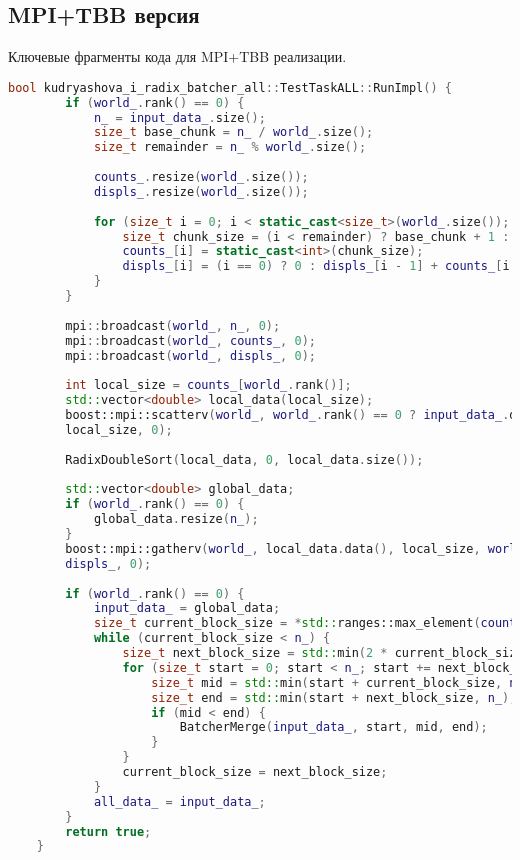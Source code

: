 \documentclass[12pt,a4paper]{extarticle}
\begin{document}
\subsection*{MPI+TBB версия}
Ключевые фрагменты кода для MPI+TBB реализации.
\begin{lstlisting}[language=C++]
	bool kudryashova_i_radix_batcher_all::TestTaskALL::RunImpl() {
		if (world_.rank() == 0) {
			n_ = input_data_.size();
			size_t base_chunk = n_ / world_.size();
			size_t remainder = n_ % world_.size();
			
			counts_.resize(world_.size());
			displs_.resize(world_.size());
			
			for (size_t i = 0; i < static_cast<size_t>(world_.size()); ++i) {
				size_t chunk_size = (i < remainder) ? base_chunk + 1 : base_chunk;
				counts_[i] = static_cast<int>(chunk_size);
				displs_[i] = (i == 0) ? 0 : displs_[i - 1] + counts_[i - 1];
			}
		}
		
		mpi::broadcast(world_, n_, 0);
		mpi::broadcast(world_, counts_, 0);
		mpi::broadcast(world_, displs_, 0);
		
		int local_size = counts_[world_.rank()];
		std::vector<double> local_data(local_size);
		boost::mpi::scatterv(world_, world_.rank() == 0 ? input_data_.data() : nullptr, counts_, displs_, local_data.data(),
		local_size, 0);
		
		RadixDoubleSort(local_data, 0, local_data.size());
		
		std::vector<double> global_data;
		if (world_.rank() == 0) {
			global_data.resize(n_);
		}
		boost::mpi::gatherv(world_, local_data.data(), local_size, world_.rank() == 0 ? global_data.data() : nullptr, counts_,
		displs_, 0);
		
		if (world_.rank() == 0) {
			input_data_ = global_data;
			size_t current_block_size = *std::ranges::max_element(counts_);
			while (current_block_size < n_) {
				size_t next_block_size = std::min(2 * current_block_size, n_);
				for (size_t start = 0; start < n_; start += next_block_size) {
					size_t mid = std::min(start + current_block_size, n_);
					size_t end = std::min(start + next_block_size, n_);
					if (mid < end) {
						BatcherMerge(input_data_, start, mid, end);
					}
				}
				current_block_size = next_block_size;
			}
			all_data_ = input_data_;
		}
		return true;
	}
	
\end{lstlisting}
\end{document}
